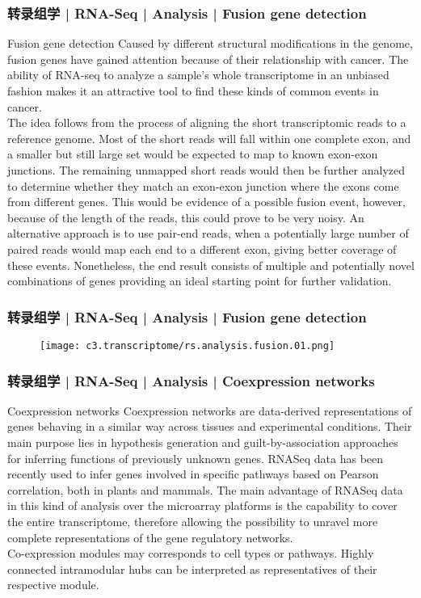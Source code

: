 \begin{frame}
  \frametitle{转录组学 | RNA-Seq | Analysis | Fusion gene detection}
  {\footnotesize
  \begin{block}{Fusion gene detection}
  Caused by different structural modifications in the genome, fusion genes have gained attention because of their relationship with cancer. The ability of RNA-seq to analyze a sample's whole transcriptome in an unbiased fashion makes it an attractive tool to find these kinds of common events in cancer.\\
  \vspace{0.5em}
  The idea follows from the process of aligning the short transcriptomic reads to a reference genome. Most of the short reads will fall within one complete exon, and a smaller but still large set would be expected to map to known exon-exon junctions. The remaining unmapped short reads would then be further analyzed to determine whether they match an exon-exon junction where the exons come from different genes. This would be evidence of a possible fusion event, however, because of the length of the reads, this could prove to be very noisy. An alternative approach is to use pair-end reads, when a potentially large number of paired reads would map each end to a different exon, giving better coverage of these events. Nonetheless, the end result consists of multiple and potentially novel combinations of genes providing an ideal starting point for further validation.
  \end{block}
  }
\end{frame}

\begin{frame}
  \frametitle{转录组学 | RNA-Seq | Analysis | Fusion gene detection}
  \begin{figure}
    \centering
    \texttt{[image: c3.transcriptome/rs.analysis.fusion.01.png]}
  \end{figure}
\end{frame}

\begin{frame}
  \frametitle{转录组学 | RNA-Seq | Analysis | Coexpression networks}
  \begin{block}{Coexpression networks}
 Coexpression networks are data-derived representations of genes behaving in a similar way across tissues and experimental conditions. Their main purpose lies in hypothesis generation and guilt-by-association approaches for inferring functions of previously unknown genes. RNASeq data has been recently used to infer genes involved in specific pathways based on Pearson correlation, both in plants and mammals. The main advantage of RNASeq data in this kind of analysis over the microarray platforms is the capability to cover the entire transcriptome, therefore allowing the possibility to unravel more complete representations of the gene regulatory networks.\\
 \vspace{0.5em}
 Co-expression modules may corresponds to cell types or pathways. Highly connected intramodular hubs can be interpreted as representatives of their respective module.
  \end{block}
\end{frame}


